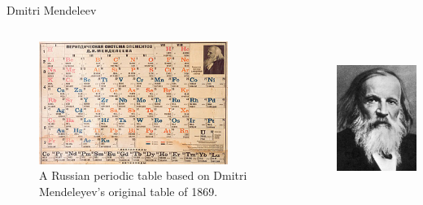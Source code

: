 \documentclass[10pt]{beamer}
\begin{document}
\begin{frame}{Dmitri Mendeleev}
    \begin{columns}
        \begin{column}{0.6\textwidth}
			\begin{figure}
				\includegraphics[height=4cm]{images/periodic_table.jpg}
				\caption{A Russian periodic table based on Dmitri Mendeleyev's original table of 1869.}
			\end{figure}
        \end{column}
        \begin{column}{0.4\textwidth}  %
                \begin{center}
					\includegraphics[height=5cm]{images/mendeleev.jpg}
                \end{center}
        \end{column}
    \end{columns}
\end{frame}
\end{document}
